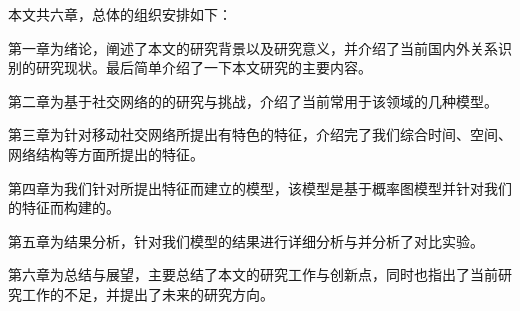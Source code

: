 本文共六章，总体的组织安排如下：

第一章为绪论，阐述了本文的研究背景以及研究意义，并介绍了当前国内外关系识别的研究现状。最后简单介绍了一下本文研究的主要内容。

第二章为基于社交网络的的研究与挑战，介绍了当前常用于该领域的几种模型。

第三章为针对移动社交网络所提出有特色的特征，介绍完了我们综合时间、空间、网络结构等方面所提出的特征。

第四章为我们针对所提出特征而建立的模型，该模型是基于概率图模型并针对我们的特征而构建的。

第五章为结果分析，针对我们模型的结果进行详细分析与并分析了对比实验。

第六章为总结与展望，主要总结了本文的研究工作与创新点，同时也指出了当前研究工作的不足，并提出了未来的研究方向。


























